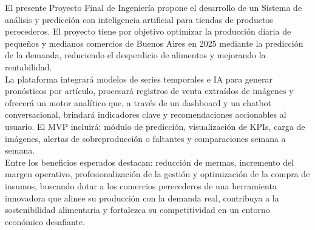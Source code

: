 \begin{Resumen} %

    \indent El presente Proyecto Final de Ingeniería propone el desarrollo de un Sistema de análisis y predicción con inteligencia artificial para tiendas de productos perecederos. El proyecto tiene por objetivo optimizar la producción diaria de pequeños y medianos comercios de Buenos Aires en 2025 mediante la predicción de la demanda, reduciendo el desperdicio de alimentos y mejorando la rentabilidad.\\

    \indent La plataforma integrará modelos de series temporales e IA para generar pronósticos por artículo, procesará registros de venta extraídos de imágenes y ofrecerá un motor analítico que, a través de un dashboard y un chatbot conversacional, brindará indicadores clave y recomendaciones accionables al usuario. El MVP incluirá: módulo de predicción, visualización de KPIs, carga de imágenes, alertas de sobreproducción o faltantes y comparaciones semana a semana.\\

    \indent Entre los beneficios esperados destacan: reducción de mermas, incremento del margen operativo, profesionalización de la gestión y optimización de la compra de insumos, buscando dotar a los comercios perecederos de una herramienta innovadora que alinee su producción con la demanda real, contribuya a la sostenibilidad alimentaria y fortalezca su competitividad en un entorno económico desafiante.

\end{Resumen}

